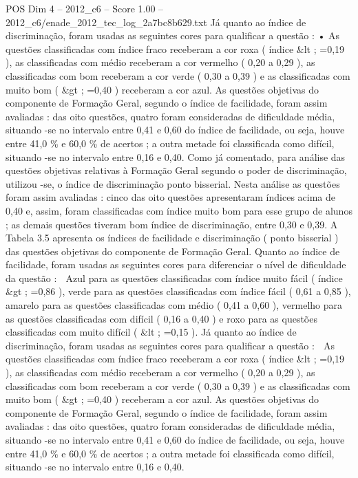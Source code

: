 \begin{textsample}{POS Dim 4 – 2012\_c6 – Score 1.00 – 2012\_c6/enade\_2012\_tec\_log\_2a7bc8b629.txt}
Já quanto ao índice de discriminação, foram usadas as seguintes cores para qualificar a questão : • As questões classificadas com índice fraco receberam a cor roxa ( índice \&lt ; =0,19 ), as classificadas com médio receberam a cor vermelho ( 0,20 a 0,29 ), as classificadas com bom receberam a cor verde ( 0,30 a 0,39 ) e as classificadas com muito bom ( \&gt ; =0,40 ) receberam a cor azul.
As questões objetivas do componente de Formação Geral, segundo o índice de facilidade, foram assim avaliadas : das oito questões, quatro foram consideradas de dificuldade média, situando -se no intervalo entre 0,41 e 0,60 do índice de facilidade, ou seja, houve entre 41,0 \% e 60,0 \% de acertos ; a outra metade foi classificada como difícil, situando -se no intervalo entre 0,16 e 0,40.
Como já comentado, para análise das questões objetivas relativas à Formação Geral segundo o poder de discriminação, utilizou -se, o índice de discriminação ponto bisserial.
Nesta análise as questões foram assim avaliadas : cinco das oito questões apresentaram índices acima de 0,40 e, assim, foram classificadas com índice muito bom para esse grupo de alunos ; as demais questões tiveram bom índice de discriminação, entre 0,30 e 0,39.
A Tabela 3.5 apresenta os índices de facilidade e discriminação ( ponto bisserial ) das questões objetivas do componente de Formação Geral.
Quanto ao índice de facilidade, foram usadas as seguintes cores para diferenciar o nível de dificuldade da questão :  Azul para as questões classificadas com índice muito fácil ( índice \&gt ; =0,86 ), verde para as questões classificadas com índice fácil ( 0,61 a 0,85 ), amarelo para as questões classificadas com médio ( 0,41 a 0,60 ), vermelho para as questões classificadas com difícil ( 0,16 a 0,40 ) e roxo para as questões classificadas com muito difícil ( \&lt ; =0,15 ).
Já quanto ao índice de discriminação, foram usadas as seguintes cores para qualificar a questão :  As questões classificadas com índice fraco receberam a cor roxa ( índice \&lt ; =0,19 ), as classificadas com médio receberam a cor vermelho ( 0,20 a 0,29 ), as classificadas com bom receberam a cor verde ( 0,30 a 0,39 ) e as classificadas com muito bom ( \&gt ; =0,40 ) receberam a cor azul.
As questões objetivas do componente de Formação Geral, segundo o índice de facilidade, foram assim avaliadas : das oito questões, quatro foram consideradas de dificuldade média, situando -se no intervalo entre 0,41 e 0,60 do índice de facilidade, ou seja, houve entre 41,0 \% e 60,0 \% de acertos ; a outra metade foi classificada como difícil, situando -se no intervalo entre 0,16 e 0,40.

\end{textsample}
